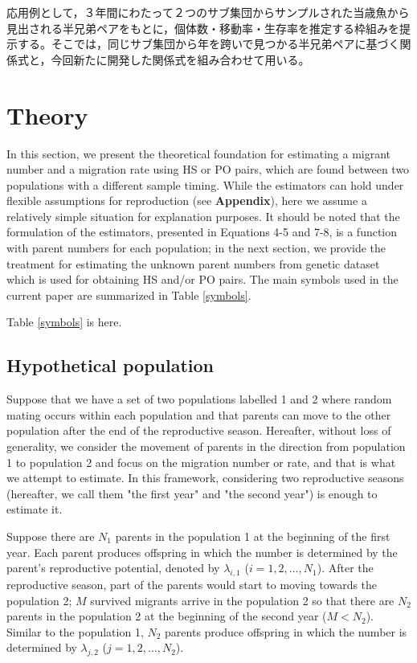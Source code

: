 \documentclass[12pt, English]{article}
\begin{document}
\begin{spacing}{1.9}
応用例として，３年間にわたって２つのサブ集団からサンプルされた当歳魚から見出される半兄弟ペアをもとに，個体数・移動率・生存率を推定する枠組みを提示する。そこでは，同じサブ集団から年を跨いで見つかる半兄弟ペアに基づく関係式と，今回新たに開発した関係式を組み合わせて用いる。

\section{Theory}\label{sec2}
In this section, we present the theoretical foundation for estimating a migrant number and a migration rate using HS or PO pairs, which are found between two populations with a different sample timing. While the estimators can hold under flexible assumptions for reproduction (see {\bf Appendix}), here we assume a relatively simple situation for explanation purposes. It should be noted that the formulation of the estimators, presented in Equations 4-5 and 7-8, is a function with parent numbers for each population; in the next section, we provide the treatment for estimating the unknown parent numbers from genetic dataset which is used for obtaining HS and/or PO pairs. The main symbols used in the current paper are summarized in Table \ref{symbols}. 

\begin{center}
Table \ref{symbols} is here. 
\end{center}

\subsection{Hypothetical population}

Suppose that we have a set of two populations labelled 1 and 2 where random mating occurs within each population and that parents can move to the other population after the end of the reproductive season. Hereafter, without loss of generality, we consider the movement of parents in the direction from population 1 to population 2 and focus on the migration number or rate, and that is what we attempt to estimate. In this framework, considering two reproductive seasons (hereafter, we call them "the first year" and "the second year") is enough to estimate it. 

Suppose there are $N_1$ parents in the population 1 at the beginning of the first year. Each parent produces offspring in which the number is determined by the parent's reproductive potential, denoted by $\lambda_{i,1}$ ($i=1,2,\ldots,N_1$). After the reproductive season, part of the parents would start to moving towards the population 2; $M$ survived migrants arrive in the population 2 so that there are $N_2$ parents in the population 2 at the beginning of the second year ($M<N_2$). Similar to the population 1, $N_2$ parents produce offspring in which the number is determined by $\lambda_{j,2}$ ($j=1,2,\ldots,N_2$). 


\end{spacing}
\end{document}

